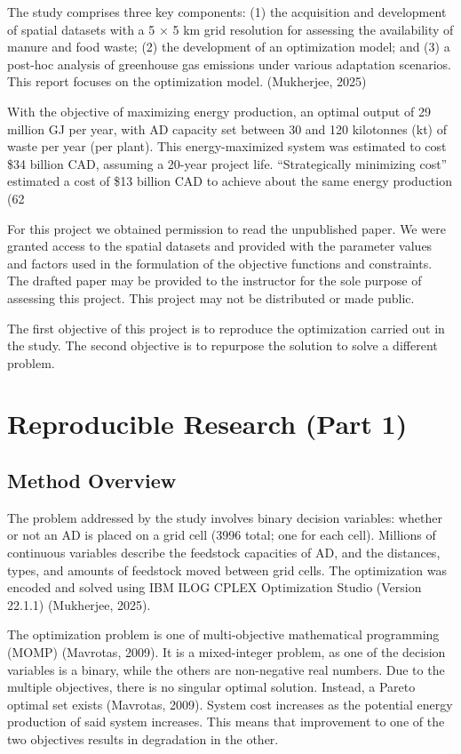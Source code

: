 \documentclass[12pt]{article}
\begin{document}
The study comprises three key components: (1) the acquisition and development of spatial datasets with a 5 × 5 km grid resolution for assessing the availability of manure and food waste; (2) the development of an optimization model; and (3) a post-hoc analysis of greenhouse gas emissions under various adaptation scenarios. This report focuses on the optimization model. (Mukherjee, 2025) 

With the objective of maximizing energy production, an optimal output of 29 million GJ per year, with AD capacity set between 30 and 120 kilotonnes (kt) of waste per year (per plant). This energy-maximized system was estimated to cost \$34 billion CAD, assuming a 20-year project life. “Strategically minimizing cost” estimated a cost of \$13 billion CAD to achieve about the same energy production (62%

For this project we obtained permission to read the unpublished paper. We were granted access to the spatial datasets and provided with the parameter values and factors used in the formulation of the objective functions and constraints. The drafted paper may be provided to the instructor for the sole purpose of assessing this project. This project may not be distributed or made public.

The first objective of this project is to reproduce the optimization carried out in the study. The second objective is to repurpose the solution to solve a different problem. 


\section{Reproducible Research (Part 1)}
\subsection{Method Overview}
The problem addressed by the study involves binary decision variables: whether or not an AD is placed on a grid cell (3996 total; one for each cell). Millions of continuous variables describe the feedstock capacities of AD, and the distances, types, and amounts of feedstock moved between grid cells. The optimization was encoded and solved using IBM ILOG CPLEX Optimization Studio (Version 22.1.1) (Mukherjee, 2025).

The optimization problem is  one of multi-objective mathematical programming (MOMP) (Mavrotas, 2009). It is a mixed-integer problem, as one of the decision variables is a binary, while the others are non-negative real numbers. Due to the multiple objectives, there is no singular optimal solution. Instead, a Pareto optimal set exists (Mavrotas, 2009). System cost increases as the potential energy production of said system increases. This means that improvement to one of the two objectives results in degradation in the other. 
\end{document}
